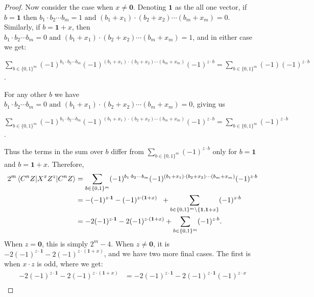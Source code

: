 \documentclass[12pt]{dalthesis}
\begin{document}
\begin{proof}
Now consider the case when $x \neq \textbf{0}$. Denoting $\textbf{1}$ as the all one vector, if $b = \textbf{1}$ then $b_1 \cdot b_2 \cdots b_m = 1 \mbox{ and } (b_1 + x_1) \cdot (b_2 + x_2) \cdots (b_m + x_m) = 0$. Similarly, if $b = \textbf{1} + x$, then $b_1 \cdot b_2 \cdots b_m = 0 \mbox{ and } (b_1 + x_1) \cdot (b_2 + x_2) \cdots (b_m + x_m) = 1$, and in either case we get: 
\begin{center}
$\sum\limits_{b \in \{0, 1\}^m} (-1)^{b_1 \cdot b_2 \cdots b_m} (-1)^{(b_1 + x_1) \cdot (b_2 + x_2) \cdots (b_m + x_m)} (-1)^{z \cdot b} = \sum\limits_{b \in \{0, 1\}^m} (-1) (-1)^{z \cdot b}$.
\end{center}
For any other $b$ we have $b_1 \cdot b_2 \cdots b_m = 0 \mbox{ and } (b_1 + x_1) \cdot (b_2 + x_2) \cdots (b_m + x_m) = 0$, giving us 
\begin{center}
$\sum\limits_{b \in \{0, 1\}^m} (-1)^{b_1 \cdot b_2 \cdots b_m} (-1)^{(b_1 + x_1) \cdot (b_2 + x_2) \cdots (b_m + x_m)} (-1)^{z \cdot b} = \sum\limits_{b \in \{0, 1\}^m} (-1)^{z \cdot b}$.
\end{center}
Thus the terms in the sum over $b$ differ from $\sum_{b \in \{0, 1\}^m} (-1)^{z \cdot b}$ only for $b = \textbf{1}$ and $b = \textbf{1} + x$. Therefore, 
\begin{equation*}
\begin{split}
2^m\braket{C^n Z|X^xZ^z|C^n Z} & = \sum\limits_{b \in \{0, 1\}^m} (-1)^{b_1 \cdot b_2 \cdots b_m} (-1)^{(b_1 + x_1) \cdot (b_2 + x_2) \cdots (b_m + x_m)} (-1)^{z \cdot b} \\
& = - (-1)^{z \cdot \textbf{1}} - (-1)^{z \cdot (\textbf{1} + x)} \hspace{2mm} + \sum\limits_{b \in \{0, 1\}^m \setminus \{\textbf{1}, \textbf{1} + x \} } (-1)^{z \cdot b}  \\
& = -2(-1)^{z \cdot \textbf{1}} - 2(-1)^{z \cdot (\textbf{1} + x)} + \sum\limits_{b \in \{0, 1\}^m} (-1)^{z \cdot b}.
\end{split}
\end{equation*}
When $z = \textbf{0}$, this is simply $2^m - 4$. When $z \neq \textbf{0}$, it is $-2(-1)^{z \cdot \textbf{1}} - 2(-1)^{z \cdot (\textbf{1} + x)}$, and we have two more final cases. The first is when $x \cdot z$ is odd, where we get:
\begin{equation*}
\begin{split}
-2(-1)^{z \cdot \textbf{1}} - 2(-1)^{z \cdot (\textbf{1} + x)} & = -2(-1)^{z \cdot \textbf{1}} - 2(-1)^{z \cdot \textbf{1}} (-1)^{z \cdot x} \\

\end{split}
\end{equation*}
\end{proof}
\end{document}
